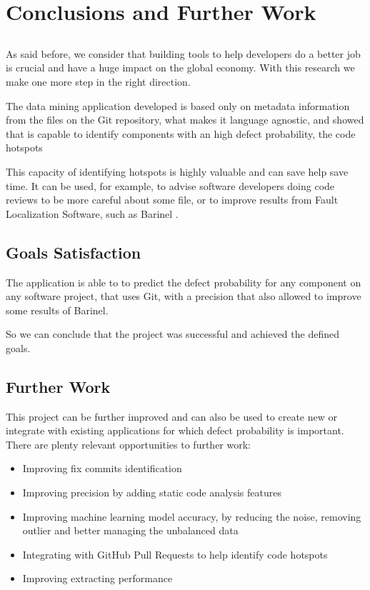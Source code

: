 \chapter{Conclusions and Further Work} \label{chap:conclusions}

\section*{}

As said before, we consider that building tools to help developers do a better job is crucial and have a huge impact on the global economy. With this research we make one more step in the right direction. 

The data mining application developed is based only on metadata information from the files on the Git repository, what makes it language agnostic, and showed that is capable to identify components with an high defect probability, the code hotspots

This capacity of identifying hotspots is highly valuable and can save help save time. It can be used, for example, to advise software developers doing code reviews to be more careful about some file, or to improve results from Fault Localization Software, such as Barinel .

\section{Goals Satisfaction}

The application is able to to predict the defect probability for any component on any software project, that uses Git, with a precision that also allowed to improve some results of Barinel.

So we can conclude that the project was successful and achieved the defined goals.


\section{Further Work}

This project can be further improved and can also be used to create new or integrate with existing applications for which defect probability is important. There are plenty relevant opportunities to further work:
%
\begin{itemize}
\item Improving fix commits identification
\item Improving precision by adding static code analysis features 
\item Improving machine learning model accuracy, by reducing the noise, removing outlier and better managing the unbalanced data
\item Integrating with GitHub Pull Requests to help identify code hotspots
\item Improving extracting performance
\end{itemize}


